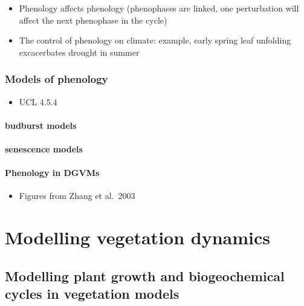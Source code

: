 \documentclass[
  oneside]{book}
\providecommand{\tightlist}{%
  \setlength{\itemsep}{0pt}\setlength{\parskip}{0pt}}
\begin{document}
\begin{itemize}
\tightlist
\item
  Phenology affects phenology (phenophases are linked, one perturbation will affect the next phenophase in the cycle)
\item
  The control of phenology on climate: example, early spring leaf unfolding excacerbates drought in summer
\end{itemize}

\hypertarget{models-of-phenology}{%
\section{Models of phenology}\label{models-of-phenology}}

\begin{itemize}
\tightlist
\item
  UCL 4.5.4
\end{itemize}

\hypertarget{budburst-models}{%
\subsection{budburst models}\label{budburst-models}}

\hypertarget{senescence-models}{%
\subsection{senescence models}\label{senescence-models}}

\hypertarget{phenology-in-dgvms}{%
\subsection{Phenology in DGVMs}\label{phenology-in-dgvms}}

\begin{itemize}
\tightlist
\item
  Figures from Zhang et al.~2003
\end{itemize}

\hypertarget{part-modelling-vegetation-dynamics}{%
\part{Modelling vegetation dynamics}\label{part-modelling-vegetation-dynamics}}

\hypertarget{modelling-plant-growth-and-biogeochemical-cycles-in-vegetation-models}{%
\chapter{Modelling plant growth and biogeochemical cycles in vegetation models}\label{modelling-plant-growth-and-biogeochemical-cycles-in-vegetation-models}}
\end{document}
